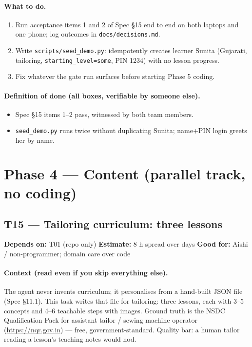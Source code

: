 \documentclass[11pt]{article}
\newcommand{\code}[1]{\texttt{#1}}
\newcommand{\taskmeta}[3]{\noindent\textbf{Depends on:} #1 \quad\textbullet\quad \textbf{Estimate:} #2 \quad\textbullet\quad \textbf{Good for:} #3\par\vspace{2pt}}
\newcommand{\ctx}[1]{\paragraph{Context (read even if you skip everything else).} #1}
\newcommand{\dod}{\paragraph{Definition of done (all boxes, verifiable by someone else).}}
\begin{document}
\paragraph{What to do.}
\begin{enumerate}
  \item Run acceptance items 1 and 2 of Spec \S15 end to end on both laptops and one phone; log outcomes in \code{docs/decisions.md}.
  \item Write \code{scripts/seed\_demo.py}: idempotently creates learner Sunita (Gujarati, tailoring, \code{starting\_level=some}, PIN 1234) with no lesson progress.
  \item Fix whatever the gate run surfaces before starting Phase 5 coding.
\end{enumerate}
\dod
\begin{itemize}
  \item Spec \S15 items 1--2 pass, witnessed by both team members.
  \item \code{seed\_demo.py} runs twice without duplicating Sunita; name+PIN login greets her by name.
\end{itemize}

\section{Phase 4 --- Content (parallel track, no coding)}

\subsection{T15 --- Tailoring curriculum: three lessons \dag}
\taskmeta{T01 (repo only)}{8 h spread over days}{Aishi / non-programmer; domain care over code}
\ctx{The agent never invents curriculum; it personalises from a hand-built JSON file (Spec \S11.1). This task writes that file for tailoring: three lessons, each with 3--5 concepts and 4--6 teachable steps with images. Ground truth is the NSDC Qualification Pack for assistant tailor / sewing machine operator (\url{https://nqr.gov.in}) --- free, government-standard. Quality bar: a human tailor reading a lesson's teaching notes would nod.}
\end{document}

